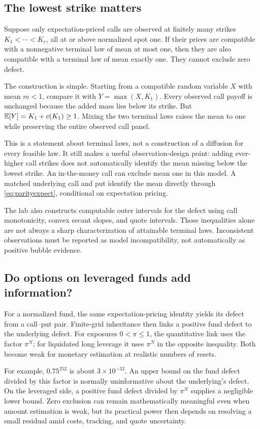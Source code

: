 \subsection{The lowest strike matters}
Suppose only expectation-priced calls are observed at finitely many
strikes $K_1<\cdots<K_r$, all at or above normalized spot one. If their
prices are compatible with a nonnegative terminal law of mean at most
one, then they are also compatible with a terminal law of mean exactly
one. They cannot exclude zero defect.

The construction is simple. Starting from a compatible random variable
$X$ with mean $m<1$, compare it with $Y=\max(X,K_1)$. Every observed
call payoff is unchanged because the added mass lies below its strike.
But $\mathbb{E}[Y]=K_1+c(K_1)\geq1$. Mixing the two terminal laws raises the
mean to one while preserving the entire observed call panel.

This is a statement about terminal laws, not a construction of a diffusion
for every feasible law. It still makes a useful observation-design point:
adding ever-higher call strikes does not automatically identify the mean
missing below the lowest strike. An in-the-money call can exclude mean
one in this model. A matched underlying call and put identify the mean
directly through \eqref{eq:parityexpect}, conditional on expectation pricing.

The lab also constructs computable outer intervals for the defect using
call monotonicity, convex secant slopes, and quote intervals. Those
inequalities alone are not always a sharp characterization of attainable
terminal laws. Inconsistent observations must be reported as model
incompatibility, not automatically as positive bubble evidence.

\subsection{Do options on leveraged funds add information?}
For a normalized fund, the same expectation-pricing identity yields its
defect from a call--put pair. Finite-grid inheritance then links a
positive fund defect to the underlying defect. For exposures
$0<\pi\leq1$, the quantitative link uses the factor $\pi^N$; for
liquidated long leverage it uses $\pi^N$ in the opposite inequality.
Both become weak for monetary estimation at realistic numbers of resets.

For example, $0.75^{252}$ is about $3\times10^{-32}$. An upper bound
on the fund defect divided by this factor is normally uninformative
about the underlying's defect. On the leveraged side, a positive fund
defect divided by $\pi^N$ supplies a negligible lower bound. Zero
exclusion can remain mathematically meaningful even when amount
estimation is weak, but its practical power then depends on resolving a
small residual amid costs, tracking, and quote uncertainty.

